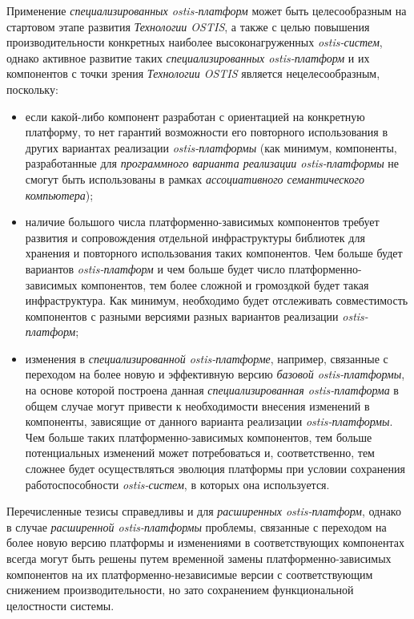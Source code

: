 Применение \textit{специализированных ostis-платформ} может быть целесообразным на стартовом этапе развития \textit{Технологии OSTIS}, а также с целью повышения производительности конкретных наиболее высоконагруженных \textit{ostis-систем}, однако активное развитие таких \textit{специализированных ostis-платформ} и их компонентов с точки зрения \textit{Технологии OSTIS} является нецелесообразным, поскольку:
\begin{itemize}
	\item если какой-либо компонент разработан с ориентацией на конкретную платформу, то нет гарантий возможности его повторного использования в других вариантах реализации \textit{ostis-платформы} (как минимум, компоненты, разработанные для \textit{программного варианта реализации ostis-платформы} не смогут быть использованы в рамках \textit{ассоциативного семантического компьютера});
	\item наличие большого числа платформенно-зависимых компонентов требует развития и сопровождения отдельной инфраструктуры библиотек для хранения и повторного использования таких компонентов. Чем больше будет вариантов \textit{ostis-платформ} и чем больше будет число платформенно-зависимых компонентов, тем более сложной и громоздкой будет такая инфраструктура. Как минимум, необходимо будет отслеживать совместимость компонентов с разными версиями разных вариантов реализации \textit{ostis-платформ};
	\item изменения в \textit{специализированной ostis-платформе}, например, связанные с переходом на более новую и эффективную версию \textit{базовой ostis-платформы}, на основе которой построена данная \textit{специализированная ostis-платформа} в общем случае могут привести к необходимости внесения изменений в компоненты, зависящие от данного варианта реализации \textit{ostis-платформы}. Чем больше таких платформенно-зависимых компонентов, тем больше потенциальных изменений может потребоваться и, соответственно, тем сложнее будет осуществляться эволюция платформы при условии сохранения работоспособности \textit{ostis-систем}, в которых она используется.
\end{itemize} 

Перечисленные тезисы справедливы и для \textit{расширенных ostis-платформ}, однако в случае \textit{расширенной ostis-платформы} проблемы, связанные с переходом на более новую версию платформы и изменениями в соответствующих компонентах всегда могут быть решены путем временной замены платформенно-зависимых компонентов на их платформенно-независимые версии с соответствующим снижением производительности, но зато сохранением функциональной целостности системы.

